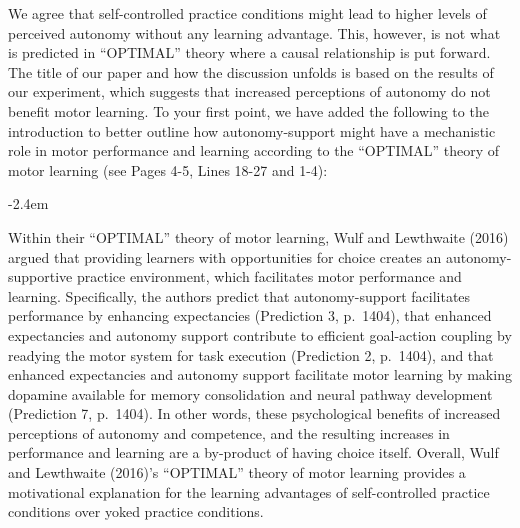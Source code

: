 \documentclass[final]{article}
\renewenvironment{quote}{\begin{fquote}\advance\leftmargini -2.4em\begin{oldquote}}{\end{oldquote}\end{fquote}}
\newenvironment{fquote}
  {\def\FrameCommand{
	\fboxsep=0.6em %
	\fcolorbox{black}{white}}%
    \MakeFramed {\advance\hsize-2\width \FrameRestore}
    \begin{minipage}{\linewidth}
  }
  {\end{minipage}\endMakeFramed}
\begin{document}
We agree that self-controlled practice conditions might lead to higher levels of perceived autonomy without any learning advantage. This, however, is not what is predicted in ``OPTIMAL'' theory where a causal relationship is put forward. The title of our paper and how the discussion unfolds is based on the results of our experiment, which suggests that increased perceptions of autonomy do not benefit motor learning. To your first point, we have added the following to the introduction to better outline how autonomy-support might have a mechanistic role in motor performance and learning according to the ``OPTIMAL'' theory of motor learning (see Pages 4-5, Lines 18-27 and 1-4):

\begin{quote}
Within their ``OPTIMAL'' theory of motor learning, Wulf and Lewthwaite (2016) argued that providing learners with opportunities for choice creates an autonomy-supportive practice environment, which facilitates motor performance and learning. Specifically, the authors predict that autonomy-support facilitates performance by enhancing expectancies (Prediction 3, p.~1404), that enhanced expectancies and autonomy support contribute to efficient goal-action coupling by readying the motor system for task execution (Prediction 2, p.~1404), and that enhanced expectancies and autonomy support facilitate motor learning by making dopamine available for memory consolidation and neural pathway development (Prediction 7, p.~1404). In other words, these psychological benefits of increased perceptions of autonomy and competence, and the resulting increases in performance and learning are a by-product of having choice itself. Overall, Wulf and Lewthwaite (2016)'s ``OPTIMAL'' theory of motor learning provides a motivational explanation for the learning advantages of self-controlled practice conditions over yoked practice conditions.
\end{quote}
\end{document}
